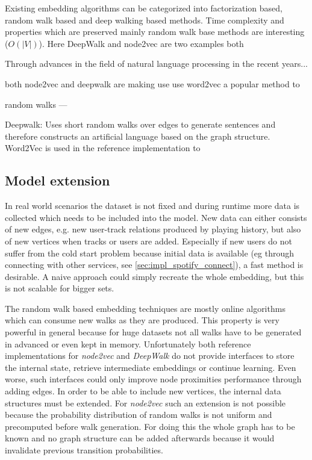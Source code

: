 \documentclass[a4paper]{llncs}
\begin{document}
	Existing embedding algorithms can be categorized into factorization based, random walk based and deep walking based methods. Time complexity and properties which are preserved mainly random walk base methods are interesting ($ O(|V|) $). Here DeepWalk and node2vec are two examples both 
	
	
	Through advances in the field of natural language processing in the recent years...
	
	both node2vec and deepwalk are making use use word2vec a popular method to 
	
	
	random walks ---
	
	Deepwalk:
	\cite{perozzi2014deepwalk}
	Uses short random walks over edges to generate sentences and therefore constructs an artificial language based on the graph structure. Word2Vec is used in the reference implementation to 
	
	
	
	\subsection{Model extension}
	In real world scenarios the dataset is not fixed and during runtime more data is collected which needs to be included into the model. New data can either consists of new edges, e.g. new user-track relations produced by playing history, but also of new vertices when tracks or users are added. Especially if new users do not suffer from the cold start problem because initial data is available (eg through connecting with other services, see \ref{sec:impl_spotify_connect}), a fast method is desirable. A naive approach could simply recreate the whole embedding, but this is not scalable for bigger sets. 
	
	The random walk based embedding techniques are mostly online algorithms which can consume new walks as they are produced. This property is very powerful in general because for huge datasets not all walks have to be generated in advanced or even kept in memory. Unfortunately both reference implementations for \emph{node2vec} and \emph{DeepWalk} do not provide interfaces to store the internal state, retrieve intermediate embeddings or continue learning. Even worse, such interfaces could only improve node proximities performance through adding edges. In order to be able to include new vertices, the internal data structures must be extended. For \emph{node2vec} such an extension is not possible because the probability distribution of random walks is not uniform and precomputed before walk generation. For doing this the whole graph has to be known and no graph structure can be added afterwards because it would invalidate previous transition probabilities.
	
\end{document}
